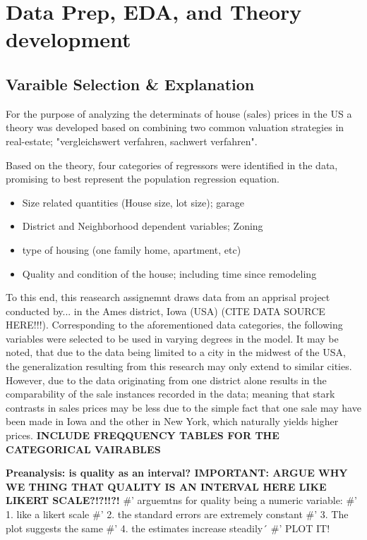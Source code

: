 \documentclass{article}
\begin{document}
\section{Data Prep, EDA, and Theory development}
\subsection{Varaible Selection \& Explanation}
\indent For the purpose of analyzing the determinats of house (sales) prices in the US a theory was developed based on combining two common valuation strategies in real-estate; "vergleichswert verfahren, sachwert verfahren".

\indent Based on the theory, four categories of regressors were identified in the data, promising to best represent the population regression equation. 
\begin{itemize}
  \item Size related quantities (House size, lot size); garage
  \item District and Neighborhood dependent variables; Zoning
  \item type of housing (one family home, apartment, etc)
  \item Quality and condition of the house; including time since remodeling
\end{itemize}

To this end, this reasearch assignemnt draws data from an apprisal project conducted by... in the Ames district, Iowa (USA) (CITE DATA SOURCE HERE!!!). Corresponding to the aforementioned data categories, the following variables were selected to be used in varying degrees in the model. It may be noted, that due to the data being limited to a city in the midwest of the USA, the generalization resulting from this research may only extend to similar cities. However, due to the data originating from one district alone results in the comparability of the sale instances recorded in the data; meaning that stark contrasts in sales prices may be less due to the simple fact that one sale may have been made in Iowa and the other in New York, which naturally yields higher prices.
\textbf{INCLUDE FREQQUENCY TABLES FOR THE CATEGORICAL VAIRABLES}

\textbf{Preanalysis: is quality as an interval? IMPORTANT: ARGUE WHY WE THING THAT QUALITY IS AN INTERVAL HERE LIKE LIKERT SCALE?!?!!?!}
#' arguemtns for quality being a numeric variable:
#' 1. like a likert scale
#' 2. the standard errors are extremely constant
#' 3. The plot suggests the same
#' 4. the estimates increase steadily´
#' PLOT IT!
\end{document}
